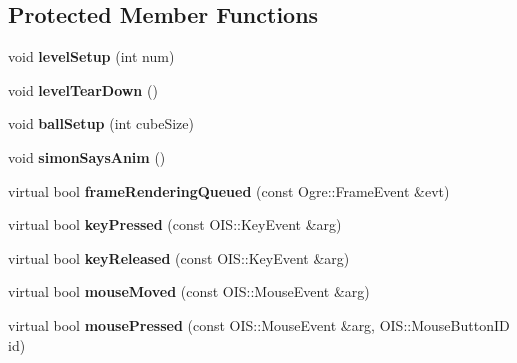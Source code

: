 \subsection*{Protected Member Functions}
\begin{DoxyCompactItemize}
\item 
\hypertarget{classMinimalOgre_ae9f7ecc90faff52ea6438fb8ce6830b2}{void {\bfseries level\-Setup} (int num)}\label{classMinimalOgre_ae9f7ecc90faff52ea6438fb8ce6830b2}

\item 
\hypertarget{classMinimalOgre_a1c40c20145c04aa6c04cb8b4dd17d751}{void {\bfseries level\-Tear\-Down} ()}\label{classMinimalOgre_a1c40c20145c04aa6c04cb8b4dd17d751}

\item 
\hypertarget{classMinimalOgre_a2a55c50655e930fcb0bf8e3e85bc1553}{void {\bfseries ball\-Setup} (int cube\-Size)}\label{classMinimalOgre_a2a55c50655e930fcb0bf8e3e85bc1553}

\item 
\hypertarget{classMinimalOgre_a5effc4206084e6b36f6d66d6f0419923}{void {\bfseries simon\-Says\-Anim} ()}\label{classMinimalOgre_a5effc4206084e6b36f6d66d6f0419923}

\item 
\hypertarget{classMinimalOgre_a81b8a54ca836c72d7c9f9cf2bb263d70}{virtual bool {\bfseries frame\-Rendering\-Queued} (const Ogre\-::\-Frame\-Event \&evt)}\label{classMinimalOgre_a81b8a54ca836c72d7c9f9cf2bb263d70}

\item 
\hypertarget{classMinimalOgre_ab49c59759e8145bc935fc78d08c8e78d}{virtual bool {\bfseries key\-Pressed} (const O\-I\-S\-::\-Key\-Event \&arg)}\label{classMinimalOgre_ab49c59759e8145bc935fc78d08c8e78d}

\item 
\hypertarget{classMinimalOgre_ad4e774634c9529663ac8c03908c91a52}{virtual bool {\bfseries key\-Released} (const O\-I\-S\-::\-Key\-Event \&arg)}\label{classMinimalOgre_ad4e774634c9529663ac8c03908c91a52}

\item 
\hypertarget{classMinimalOgre_a2e6ef7a2820e03881d5fe994573518da}{virtual bool {\bfseries mouse\-Moved} (const O\-I\-S\-::\-Mouse\-Event \&arg)}\label{classMinimalOgre_a2e6ef7a2820e03881d5fe994573518da}

\item 
\hypertarget{classMinimalOgre_ac5b07685044371021b55d2b203742c06}{virtual bool {\bfseries mouse\-Pressed} (const O\-I\-S\-::\-Mouse\-Event \&arg, O\-I\-S\-::\-Mouse\-Button\-I\-D id)}\label{classMinimalOgre_ac5b07685044371021b55d2b203742c06}


\end{DoxyCompactItemize}
